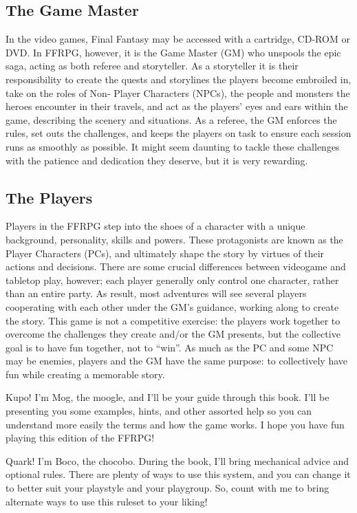 \begin{multicols}{2}
\subsection{The Game Master}
In the video games, Final Fantasy may be
accessed with a cartridge, CD-ROM or DVD. In
FFRPG, however, it is the Game Master (GM) who
unspools the epic saga, acting as both referee and
storyteller. As a storyteller it is their responsibility
to create the quests and storylines the players
become embroiled in, take on the roles of Non-
Player Characters (NPCs), the people and
monsters the heroes encounter in their travels,
and act as the players' eyes and ears within the
game, describing the scenery and situations. As a
referee, the GM enforces the rules, set outs the
challenges, and keeps the players on task to ensure
each session runs as smoothly as possible. It might
seem daunting to tackle these challenges with the
patience and dedication they deserve, but it is very
rewarding.

\subsection{The Players}
Players in the FFRPG step into the shoes of a
character with a unique background, personality,
skills and powers. These protagonists are known
as the Player Characters (PCs), and ultimately
shape the story by virtues of their actions and
decisions. There are some crucial differences
between videogame and tabletop play, however;
each player generally only control one character,
rather than an entire party. As result, most
adventures will see several players cooperating
with each other under the GM's guidance, working
along to create the story. This game is not a
competitive exercise: the players work together to
overcome the challenges they create and/or the
GM presents, but the collective goal is to have fun
together, not to “win”. As much as the PC and some
NPC may be enemies, players and the GM have the
same purpose: to collectively have fun while
creating a memorable story.

Kupo! I'm Mog, the moogle, and I'll be your guide
through this book. I'll be presenting you some examples,
hints, and other assorted help so you can understand
more easily the terms and how the game works. I hope
you have fun playing this edition of the FFRPG!

Quark! I'm Boco, the chocobo. During the
book, I'll bring mechanical advice and optional
rules. There are plenty of ways to use this system,
and you can change it to better suit your playstyle
and your playgroup. So, count with me to bring
alternate ways to use this ruleset to your liking!


\end{multicols}
